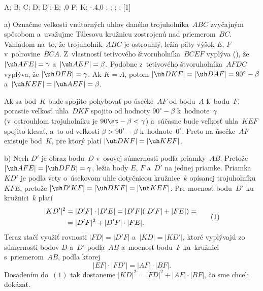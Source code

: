 {%
\fontplace
\rpoint A; \lpoint B; \bpoint C; \lBpoint D;
\lpoint D'; \rbpoint E; \tpoint{},0 F; \trpoint K;
\cpoint\xy-.4,0 \g; \cpoint\g; \cpoint\g; \cpoint\g;
[1] \hfil\Obr

a) Označme veľkosti vnútorných uhlov daného trojuholníka~$ABC$
zvyčajným spôsobom a~uvažujme Tálesovu kružnicu zostrojenú nad
priemerom~$BC$. Vzhľadom na~to, že trojuholník~$ABC$ je
ostrouhlý, ležia päty výšok $E$, $F$ v~polrovine~$BCA$.
Z~vlastností tetivového štvoruholníka~$BCEF$ vyplýva (\obr), že
$|\uh AFE|=\gamma$ a~$|\uh AEF|=\beta$. Podobne
z~tetivového štvoruholníka~$AFDC$ vyplýva, že $|\uh DFB|=\gamma$.
Ak $K=A$, potom $|\uh DKF|=|\uh DAF|=90^{\circ}-\beta$
a~$|\uh KEF|=|\uh AEF|=\beta$.
\midinsert
\inspicture{}
\endinsert

Ak sa bod~$K$ bude spojito pohybovať po úsečke~$AF$ od
bodu~$A$ k~bodu~$F$, porastie veľkosť uhla~$DKF$ spojito
od hodnoty $90^{\circ}-\beta$ k~hodnote~$\gamma$ (v~ostrouhlom
trojuholníku je $90\st-\beta<\gamma$) a~súčasne bude veľkosť
uhla~$KEF$ spojito klesať, a~to od veľkosti
$\beta>90^{\circ}-\beta$ k~hodnote~$0^{\circ}$. Preto na úsečke~$AF$
existuje bod~$K$, pre ktorý platí $|\uh DKF|=|\uh KEF|$.

\smallskip
b) Nech $D'$ je obraz bodu~$D$ v~osovej súmernosti podľa priamky~$AB$.
Pretože $|\uh AFE|=|\uh DFB|=\gamma$, ležia body $E$,
$F$ a~$D'$ na jednej priamke.
Priamka~$KD'$ je podľa vety o~úsekovom uhle dotyčnicou kružnice~$k$
opísanej trojuholníku~$KFE$, pretože $|\uh D'KF|=|\uh DKF|=|\uh KEF|$.
Pre mocnosť bodu~$D'$ ku kružnici~$k$ platí
$$
\aligned
|KD'|^2&=|D'F|\cdot|D'E|=|D'F|(|D'F|+|FE|)=\\
       &=|D'F|^2+|D'F|\cdot|FE|.
\endaligned                      \tag1
$$
Teraz stačí využiť rovnosti $|FD|=|D'F|$ a~$|KD|=|KD'|$, ktoré
vyplývajú zo súmernosti bodov $D$ a~$D'$ podľa~$AB$ a~mocnosť
bodu~$F$ ku~kružnici s~priemerom~$AB$, podľa ktorej
$$
|EF|\cdot|FD'|=|AF|\cdot|BF|.
$$
Dosadením do~$(1)$ tak dostaneme $|KD|^2=|FD|^2+|AF|\cdot|BF|$, čo
sme chceli dokázať.}

